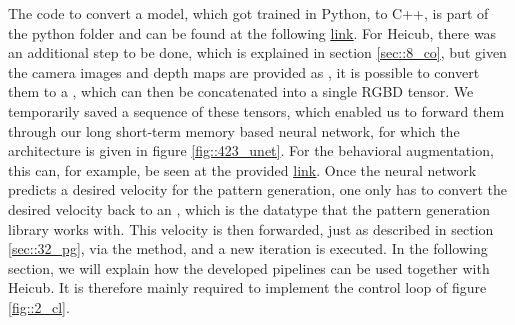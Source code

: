 The code to convert a model, which got trained in Python, to C++, is part of the python folder and can be found at the following \href{https://github.com/mhubii/nmpc_pattern_generator/blob/master/libs/learning/python/python_to_cpp.py}{\underline{link}}. For Heicub, there was an additional step to be done, which is explained in section \ref{sec::8_co}, but given the camera images and depth maps are provided as , it is possible to convert them to a , which can then be concatenated into a single RGBD tensor. We temporarily saved a sequence of these tensors, which enabled us to forward them through our long short-term memory based neural network, for which the architecture is given in figure \ref{fig::423_unet}. For the behavioral augmentation, this can, for example, be seen at the provided \href{https://github.com/mhubii/nmpc_pattern_generator/blob/719fde0bb73925923de85cbf379c5523e075dfeb/src/behavioural_augmentation_real_robot_external_data.cpp#L625}{\underline{link}}. Once the neural network predicts a desired velocity for the pattern generation, one only has to convert the desired velocity back to an , which is the datatype that the pattern generation library works with. This velocity is then forwarded, just as described in section \ref{sec::32_pg}, via the  method, and a new iteration is executed. In the following section, we will explain how the developed pipelines can be used together with Heicub. It is therefore mainly required to implement the control loop of figure \ref{fig::2_cl}. 